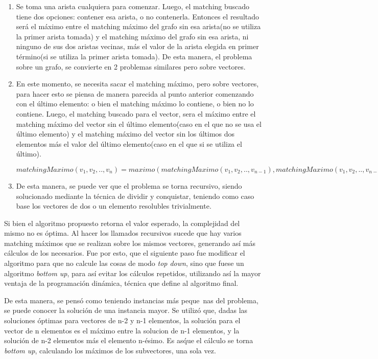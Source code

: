 \documentclass[a4paper, 12pt]{article}
\begin{document}
\begin{enumerate}
\item Se toma una arista cualquiera para comenzar. Luego, el matching buscado tiene dos opciones: contener esa arista, o no contenerla. Entonces el resultado ser\'a el m\'aximo entre el matching m\'aximo del grafo sin esa arista(no se utiliza la primer arista tomada) y el matching m\'aximo del grafo sin esa arista, ni ninguno de sus dos aristas vecinas, m\'as el valor de la arista elegida en primer t\'ermino(si se utiliza la primer arista tomada). De esta manera, el problema sobre un grafo, se convierte en 2 problemas similares pero sobre vectores.
\item En este momento, se necesita sacar el matching m\'aximo, pero sobre vectores, para hacer esto se piensa de manera parecida al punto anterior comenzando con el \'ultimo elemento: o bien el matching m\'aximo lo contiene, o bien no lo contiene. Luego, el matching buscado para el vector, sera el m\'aximo entre el matching m\'aximo del vector sin el \'ultimo elemento(caso en el que no se usa el \'ultimo elemento) y el matching m\'aximo del vector sin los \'ultimos dos elementos m\'as el valor del \'ultimo elemento(caso en el que si se utiliza el \'ultimo).

	$matchingMaximo(v_1,v_2,..,v_n) = maximo(matchingMaximo(v_1,v_2,..,v_{n-1}), matchingMaximo(v_1,v_2,..,v_{n-2}) + v_n)$
\item De esta manera, se puede ver que el problema se torna recursivo, siendo solucionado mediante la t\'ecnica de dividir y conquistar, teniendo como caso base los vectores de dos o un elemento resolubles trivialmente.
\end{enumerate}

Si bien el algoritmo propuesto retorna el valor esperado, la complejidad del mismo no es \'optima. Al hacer los llamados recursivos sucede que hay varios matching m\'aximos que se realizan sobre los mismos vectores, generando as\'i m\'as c\'alculos de los necesarios. Fue por esto, que el siguiente paso fue modificar el algoritmo para que no calcule las cosas de modo \emph{top down}, sino que fuese un algoritmo \emph{bottom up}, para as\'i evitar los c\'alculos repetidos, utilizando as\'i la mayor ventaja de la programaci\'on din\'amica, t\'ecnica que define al algoritmo final.

De esta manera, se pens\'o como teniendo instancias m\'as peque~{n}as del problema, se puede conocer la soluci\'on de una instancia mayor. Se utiliz\'o que, dadas las soluciones \'optimas para vectores de n-2 y n-1 elementos, la soluci\'on para el vector de n elementos es el m\'aximo entre la solucion de n-1 elementos, y la soluci\'on de n-2 elementos m\'as el elemento n-\'esimo. Es as\' que el c\'alculo se torna \emph{bottom up}, calculando los m\'aximos de los subvectores, una sola vez.
\end{document}
